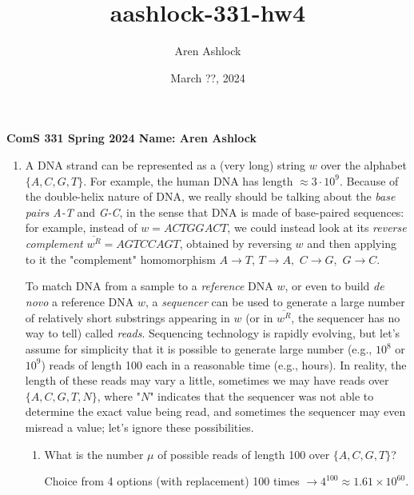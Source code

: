 \documentclass[12pt]{article}
\title{aashlock-331-hw4}
\author{Aren Ashlock}
\date{March ??, 2024}
\begin{document}
\noindent\textbf{ComS 331 \quad Spring 2024 \quad Name: Aren Ashlock}

\begin{enumerate}


\item A DNA strand can be represented as a (very long) string $w$ over the alphabet $\{A, C, G, T\}$. For example, the human DNA has length $\approx 3 \cdot 10^9$. Because of the double-helix nature of DNA, we really should be talking about the \textit{base pairs A-T} and \textit{G-C}, in the sense that DNA is made of base-paired sequences: for example, instead of $w = ACTGGACT$, we could instead look at its \textit{reverse complement} $\overline{w^R} = AGTCCAGT$, obtained by reversing $w$ and then applying to it the "complement" homomorphism $A \rightarrow T$, $T \rightarrow A,$ $C \rightarrow G,$ $G \rightarrow C$.

To match DNA from a sample to a \textit{reference} DNA $w$, or even to build \textit{de novo} a reference DNA $w$, a \textit{sequencer} can be used to generate a large number of relatively short substrings appearing in $w$ (or in $\overline{w^R}$, the sequencer has no way to tell) called \textit{reads}. Sequencing technology is rapidly evolving, but let's assume for simplicity that it is possible to generate large number (e.g., $10^8$ or $10^9$) reads of length 100 each in a reasonable time (e.g., hours). In reality, the length of these reads may vary a little, sometimes we may have reads over $\{A, C, G, T, N\}$, where "$N$" indicates that the sequencer was not able to determine the exact value being read, and sometimes the sequencer may even misread a value; let's ignore these possibilities.

\begin{enumerate}[label=(\alph*)]

    
    \item What is the number $\mu$ of possible reads of length 100 over $\{A, C, G, T\}$?

    \color{blue}
    Choice from 4 options (with replacement) 100 times $\rightarrow 4^{100} \approx 1.61 \times 10^{60}$.
    \color{black}



\end{enumerate}
\end{enumerate}
\end{document}

